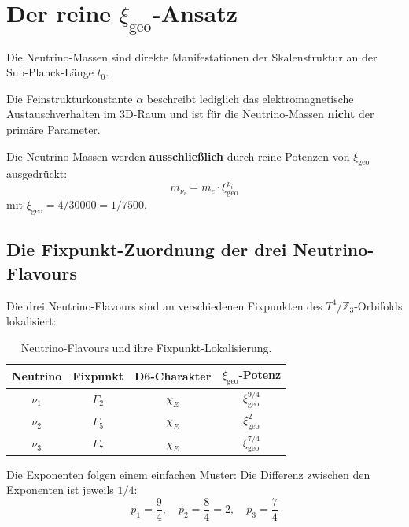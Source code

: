 \documentclass[11pt,a4paper]{article}
\newcommand{\xigeo}{\xi_{\text{geo}}}
\begin{document}
	\section{Der reine $\xigeo$-Ansatz}
	
	\begin{tcolorbox}[colback=blue!5!white,colframe=blue!50!black,title=Zentraler Ansatz: Keine $\alpha$-Korrektur für Neutrino-Massen]
		Die Neutrino-Massen sind direkte Manifestationen der Skalenstruktur an der Sub-Planck-Länge $t_0$.
		
		Die Feinstrukturkonstante $\alpha$ beschreibt lediglich das elektromagnetische Austauschverhalten im 3D-Raum und ist für die Neutrino-Massen \textbf{nicht} der primäre Parameter.
		
		Die Neutrino-Massen werden \textbf{ausschließlich} durch reine Potenzen von $\xigeo$ ausgedrückt:
		\begin{equation}
			m_{\nu_i} = m_e \cdot \xigeo^{p_i}
		\end{equation}
		mit $\xigeo = 4/30000 = 1/7500$.
	\end{tcolorbox}
	
	\subsection{Die Fixpunkt-Zuordnung der drei Neutrino-Flavours}
	
	Die drei Neutrino-Flavours sind an verschiedenen Fixpunkten des $T^4/\mathbb{Z}_3$-Orbifolds lokalisiert:
	
	\begin{table}[h!]
		\centering
		\caption{Neutrino-Flavours und ihre Fixpunkt-Lokalisierung.}
		\label{tab:neutrino_fixpoints}
		\begin{tabular}{c c c c}
			\toprule
			\textbf{Neutrino} & \textbf{Fixpunkt} & \textbf{D6-Charakter} & \textbf{$\xigeo$-Potenz} \\
			\midrule
			$\nu_1$ & $F_2$ & $\chi_E$ & $\xigeo^{9/4}$ \\
			$\nu_2$ & $F_5$ & $\chi_E$ & $\xigeo^{2}$ \\
			$\nu_3$ & $F_7$ & $\chi_E$ & $\xigeo^{7/4}$ \\
			\bottomrule
		\end{tabular}
	\end{table}
	
	Die Exponenten folgen einem einfachen Muster: Die Differenz zwischen den Exponenten ist jeweils $1/4$:
	\begin{equation}
		p_1 = \frac{9}{4}, \quad p_2 = \frac{8}{4} = 2, \quad p_3 = \frac{7}{4}
	\end{equation}
	
\end{document}
